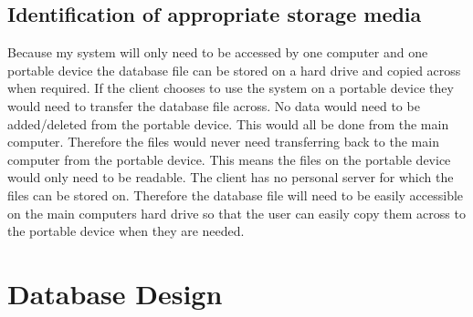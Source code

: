 \subsection{Identification of appropriate storage media}
Because my system will only need to be accessed by one computer and one portable device the database file can be stored on a hard drive and copied across when required. If the client chooses to use the system on a portable device they would need to transfer the database file across. No data would need to be added/deleted from the portable device. This would all be done from the main computer. Therefore the files would never need transferring back to the main computer from the portable device. This means the files on the portable device would only need to be readable. The client has no personal server for which the files can be stored on. Therefore the database file will need to be easily accessible on the main computers hard drive so that the user can easily copy them across to the portable device when they are needed. 
\section{Database Design}

